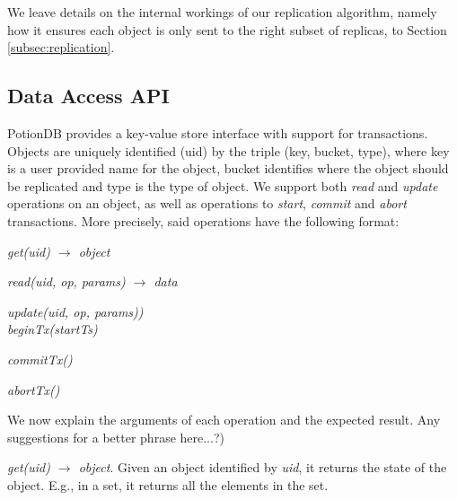 \documentclass{vldb}
\newcommand{\grumbler}[2]{{\color{red}{\bf #1:} #2}}
\renewcommand{\grumbler}[2]{}
\newcommand{\andre}[1]{\grumbler{andre}{#1}}
\newcommand{\emphvspace}{0.5\baselineskip}
\newcommand{\firstblockemph}[1]{\vspace{\emphvspace}\hspace{2em}\emph{#1}}
\newcommand{\middleblockemph}[1]{\hspace{2em}\emph{#1}}
\newcommand{\lastblockemph}[1]{\hspace{2em}\emph{#1}\vspace{\emphvspace}}
\begin{document}
We leave details on the internal workings of our replication algorithm, namely how it ensures each object is only sent to the right subset of replicas, to Section \ref{subsec:replication}.





\subsection{Data Access API}

\andre{I repeated the uid explanation from Database Model and API to here... where should it stay?}

PotionDB provides a key-value store interface with support for transactions.
Objects are uniquely identified (uid) by the triple (key, bucket, type), where key is a user provided name for the object, bucket identifies where the object should be replicated and type is the type of object.
We support both \emph{read} and \emph{update} operations on an object, as well as operations to \emph{start}, \emph{commit} and \emph{abort} transactions.
More precisely, said operations have the following format:

\firstblockemph{get(uid) $\rightarrow$ object}

\middleblockemph{read(uid, op, params) $\rightarrow$ data}

\middleblockemph{update(uid, op, params))} \\

\middleblockemph{beginTx(startTs)}

\middleblockemph{commitTx()}

\lastblockemph{abortTx()}

We now explain the arguments of each operation and the expected result.
\andre(Any suggestions for a better phrase here...?)

\emph{get(uid) $\rightarrow$ object}. Given an object identified by \emph{uid}, it returns the state of the object.
E.g., in a set, it returns all the elements in the set.
\end{document}
